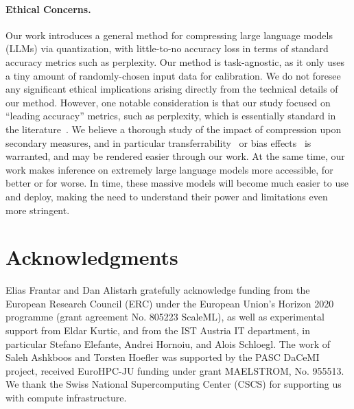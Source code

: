 \paragraph{Ethical Concerns.}
Our work introduces a general method for compressing large language models (LLMs) via quantization, with little-to-no accuracy loss in terms of standard accuracy metrics such as perplexity. 
Our method is task-agnostic, as it only uses a tiny amount of randomly-chosen input data for calibration. 
We do not foresee any significant ethical implications arising directly from the technical details of our method. 
However, one notable consideration is that our study focused on ``leading accuracy'' metrics, such as perplexity, which is essentially standard in the literature~\cite{dettmers2022llm, yao2022zeroquant}. 
We believe a thorough study of the impact of compression upon secondary measures, and in particular transferrability~\cite{iofinova2022well} or bias effects~\cite{bender2021dangers} is warranted, and may be rendered easier through our work.  
At the same time, our work makes inference on extremely large language models more accessible, for better or for worse. 
In time, these massive models will become much easier to use and deploy, making the need to understand their power and limitations even more stringent. 

\section*{Acknowledgments}

Elias Frantar and Dan Alistarh gratefully acknowledge funding from the European Research Council (ERC) under the European Union’s Horizon 2020 programme (grant agreement No. 805223 ScaleML), as well as experimental support from Eldar Kurtic, and from the IST Austria IT department, in particular Stefano Elefante, Andrei Hornoiu, and Alois Schloegl. 
The work of Saleh Ashkboos and Torsten Hoefler was supported by the PASC DaCeMI project, received EuroHPC-JU funding under grant MAELSTROM, No. 955513. We thank the Swiss National Supercomputing Center (CSCS) for supporting us with compute infrastructure.


